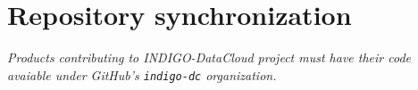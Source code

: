 \section{Repository synchronization}
\footnotesize
\textcolor{gray!90}{\textit{Products contributing to INDIGO-DataCloud project must have their code avaiable under GitHub's \texttt{indigo-dc} organization.}}
\normalsize
\\[0.1in]
